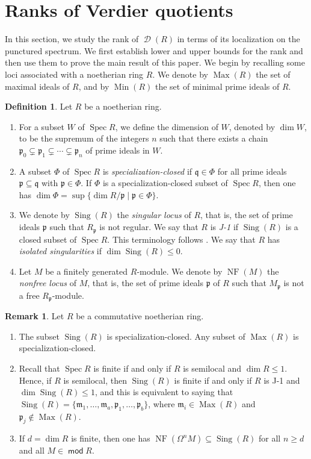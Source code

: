 \documentclass[10pt]{amsart}
\theoremstyle{definition}
\newtheorem{dfn}[thm]{Definition}
\newtheorem{rem}[thm]{Remark}
\theoremstyle{remark}
\numberwithin{equation}{thm}
\def\d{\operatorname{\mathscr{D}}}
\def\dim{\operatorname{dim}}
\def\ge{\geqslant}
\def\le{\leqslant}
\def\m{\mathfrak{m}}
\def\Max{\operatorname{Max}}
\def\Min{\operatorname{Min}}
\def\mod{\operatorname{\mathsf{mod}}}
\def\NF{\operatorname{NF}}
\def\p{\mathfrak{p}}
\def\q{\mathfrak{q}}
\def\Sing{\operatorname{Sing}}
\def\Spec{\operatorname{Spec}}
\def\sup{\operatorname{sup}}
\begin{document}
\section{Ranks of Verdier quotients}
In this section, we study the rank of $\d(R)$ in terms of its localization on the punctured spectrum. 
We first establish lower and upper bounds for the rank and then use them to prove the main result of this paper.
We begin by recalling some loci associated with a noetherian ring $R$.
We denote by $\Max(R)$ the set of maximal ideals of $R$, and by $\Min(R)$ the set of minimal prime ideals of $R$.
\begin{dfn}\label{def_locus}
Let $R$ be a noetherian ring.
\begin{enumerate}[\rm(1)]
\item
For a subset $W$ of $\Spec R$, we define the dimension of $W$, denoted by $\dim W$, to be the supremum of the integers $n$ such that there exists a chain $\p_{0}\subsetneq \p_{1}\subsetneq \cdots \subsetneq \p_{n}$ of prime ideals in $W$.
\item
A subset $\Phi$ of $\Spec R$ is {\em specialization-closed} if $\q\in\Phi$ for all prime ideals $\p\subseteq\q$ with $\p\in\Phi$.
If $\Phi$ is a specialization-closed subset of $\Spec R$, then one has $\dim\Phi=\sup\{\dim R/\p\mid\p\in\Phi\}$.
\item
We denote by $\Sing(R)$ the {\em singular locus} of $R$, that is, the set of prime ideals $\p$ such that $R_{\p}$ is not regular.
We say that $R$ is {\em J-1} if $\Sing(R)$ is a closed subset of $\Spec R$.
This terminology follows \cite{Mat.CA}.
We say that $R$ has {\em isolated singularities} if $\dim\Sing(R)\le 0$.
\item
Let $M$ be a finitely generated $R$-module.
We denote by $\NF(M)$ the {\em nonfree locus} of $M$, that is, the set of prime ideals $\p$ of $R$ such that $M_{\p}$ is not a free $R_{\p}$-module.
\end{enumerate}
\end{dfn}
\begin{rem}\label{rem_locus}
Let $R$ be a commutative noetherian ring.
\begin{enumerate}[\rm(1)]
\item
The subset $\Sing(R)$ is specialization-closed.
Any subset of $\Max(R)$ is specialization-closed.
\item
Recall that $\Spec R$ is finite if and only if $R$ is semilocal and $\dim R\le 1$.
Hence, if $R$ is semilocal, then $\Sing(R)$ is finite if and only if $R$ is J-1 and $\dim\Sing(R)\le 1$, and this is equivalent to saying that $\Sing(R)=\{\m_{1},\ldots,\m_{a},\p_{1},\ldots,\p_{b}\}$, where $\m_{i}\in\Max(R)$ and $\p_{j}\notin\Max(R)$.
\item
If $d=\dim R$ is finite, then one has $\NF(\Omega^{n}M)\subseteq\Sing(R)$ for all $n\ge d$ and all $M\in\mod R$.
\end{enumerate}
\end{rem}
\end{document}
